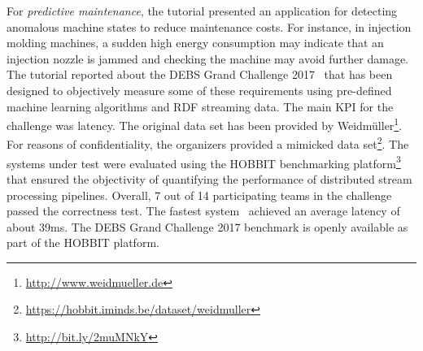 For \emph{predictive maintenance}, the tutorial presented an application for detecting anomalous machine states to reduce maintenance costs. For instance, in injection molding machines, a sudden high energy consumption may indicate that an injection nozzle is jammed and checking the machine may avoid further damage. The tutorial reported about the DEBS Grand Challenge 2017~\cite{gulisano_et_al_2017} that has been designed to objectively measure some of these requirements using pre-defined machine learning algorithms and RDF streaming data. The main KPI for the challenge was latency. The original data set has been provided by \textsf{Weidmüller}\footnote{\url{http://www.weidmueller.de}}. For reasons of confidentiality, the organizers provided a mimicked data set\footnote{\url{https://hobbit.iminds.be/dataset/weidmuller}}. The systems under test were evaluated using the \textsf{H\small OBBIT} benchmarking platform\footnote{\url{http://bit.ly/2muMNkY}} that ensured the objectivity of quantifying the performance of distributed stream processing pipelines. Overall, 7 out of 14 participating teams in the challenge passed the correctness test. The fastest system~\cite{amariei_et_al_2017} achieved an average latency of about 39ms. The DEBS Grand Challenge 2017 benchmark is openly available as part of the \textsf{H\small OBBIT} platform.








